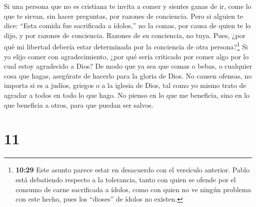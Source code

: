  Si una persona que no es cristiana te invita a comer y
sientes ganas de ir, come lo que te sirvan, sin hacer preguntas, por
razones de conciencia.  Pero si alguien te dice: ``Esta
comida fue sacrificada a ídolos,'' no la comas, por causa de quien te lo
dijo, y por razones de conciencia.  Razones de su
conciencia, no tuya. Pues, ¿por qué mi libertad debería estar
determinada por la conciencia de otra persona?\footnote{\textbf{10:29}
  Este asunto parece estar en desacuerdo con el versículo anterior.
  Pablo está debatiendo respecto a la tolerancia, tanto con quien se
  ofende por el consumo de carne sacrificada a ídolos, como con quien no
  ve ningún problema con este hecho, pues los ``dioses'' de ídolos no
  existen.}  Si yo elijo comer con agradecimiento, ¿por qué
sería criticado por comer algo por lo cual estoy agradecido a Dios?
 De modo que ya sea que comas o bebas, o cualquier cosa que
hagas, asegúrate de hacerlo para la gloria de Dios.  No
causen ofensas, no importa si es a judíos, griegos o a la iglesia de
Dios,  tal como yo mismo trato de agradar a todos en todo
lo que hago. No pienso en lo que me beneficia, sino en lo que beneficia
a otros, para que puedan ser salvos.

\hypertarget{section-10}{%
\section{11}\label{section-10}}

